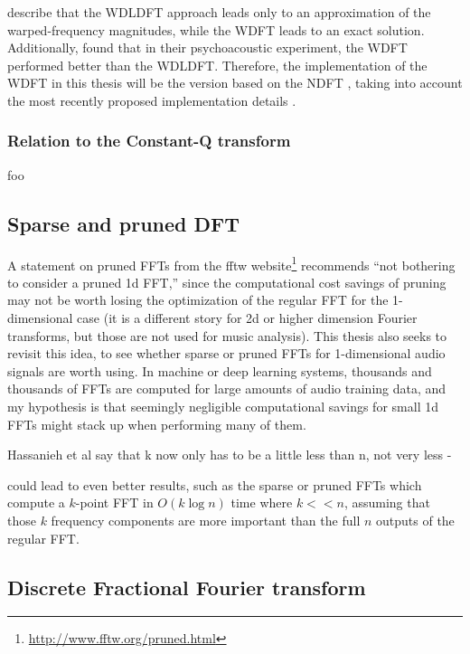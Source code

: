 \documentclass[letter,12pt,notitlepage]{article}
\begin{document}
\citet{warped1} describe that the WDLDFT approach leads only to an approximation of the warped-frequency magnitudes, while the WDFT leads to an exact solution. Additionally, \citet{warpedcomparison} found that in their psychoacoustic experiment, the WDFT performed better than the WDLDFT. Therefore, the implementation of the WDFT in this thesis will be the version based on the NDFT \cite{warped1}, taking into account the most recently proposed implementation details \cite{warped2}.


\subsubsection{Relation to the Constant-Q transform}

foo

\subsection{Sparse and pruned DFT}

A statement on pruned FFTs from the fftw website\footnote{\href{http://www.fftw.org/pruned.html}{http://www.fftw.org/pruned.html}} recommends ``not bothering to consider a pruned 1d FFT,'' since the computational cost savings of pruning may not be worth losing the optimization of the regular FFT for the 1-dimensional case (it is a different story for 2d or higher dimension Fourier transforms, but those are not used for music analysis). This thesis also seeks to revisit this idea, to see whether sparse or pruned FFTs for 1-dimensional audio signals are worth using. In machine or deep learning systems, thousands and thousands of FFTs are computed for large amounts of audio training data, and my hypothesis is that seemingly negligible computational savings for small 1d FFTs might stack up when performing many of them.

Hassanieh et al say that k now only has to be a little less than n, not very less - 

 could lead to even better results, such as the sparse or pruned FFTs which compute a $k$-point FFT in $O(k \log n)$ time where $k << n$, assuming that those $k$ frequency components are more important than the full $n$ outputs of the regular FFT.



\subsection{Discrete Fractional Fourier transform}
\end{document}
